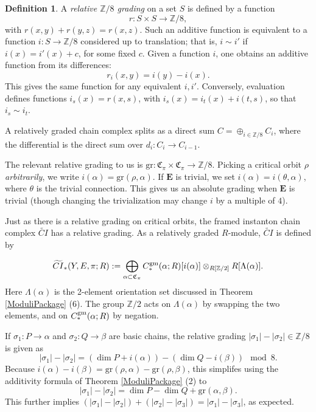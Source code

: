 \documentclass{memo-l}
\theoremstyle{definition}
\newtheorem{definition}[theorem]{Definition}
\theoremstyle{remark}
\numberwithin{section}{chapter}
\numberwithin{equation}{chapter}
\begin{document}
\begin{definition}\label{relgrading}A \emph{relative $\mathbb Z/8$ grading} on a set $S$ is defined by a function 
$$r: S \times S \to \mathbb Z/8,$$ 
with $r(x,y) + r(y,z) = r(x,z)$. Such an additive function is equivalent to a function $i: S \to \mathbb Z/8$ considered up to translation; that is, $i \sim i'$ if $i(x) = i'(x) + c$, for some fixed $c$. Given a function $i$, one obtains an additive function from its differences: $$r_i(x,y) = i(y) - i(x).$$ This gives the same function for any equivalent $i, i'$. Conversely, evaluation defines functions $i_s(x) = r(x,s)$, with $i_s(x) = i_t(x) + i(t,s)$, so that $i_s \sim i_t$. 

A relatively graded chain complex splits as a direct sum $C = \oplus_{i \in \mathbb Z/8} C_i$, where the differential is the direct sum over $d_i: C_i \to C_{i-1}$. 
\end{definition}

The relevant relative grading to us is $\text{gr}: \mathfrak C_\pi \times \mathfrak C_\pi \to \mathbb Z/8$. Picking a critical orbit $\rho$ \emph{arbitrarily}, we write $i(\alpha) = \text{gr}(\rho, \alpha)$. If $\mathbf{E}$ is trivial, we set $i(\alpha) = i(\theta, \alpha)$, where $\theta$ is the trivial connection. This gives us an absolute grading when $\mathbf{E}$ is trivial (though changing the trivialization may change $i$ by a multiple of $4$). 

Just as there is a relative grading on critical orbits, the framed instanton chain complex $\widetilde{CI}$ has a relative grading. As a relatively graded $R$-module, $\widetilde{CI}$ is defined by

$$\widetilde{CI}_*(Y,E,\pi;R) := \bigoplus_{\alpha \subset \mathfrak C_\pi} C_{*}^{\textup{gm}}(\alpha;R)[i(\alpha)] \otimes_{R[\mathbb Z/2]} R[\Lambda(\alpha)].$$ Here $\Lambda(\alpha)$ is the 2-element orientation set discussed in Theorem \ref{ModuliPackage} (6). The group $\mathbb Z/2$ acts on $\Lambda(\alpha)$ by swapping the two elements, and on $C_*^{\text{\textup{gm}}}(\alpha;R)$ by negation.

If $\sigma_1: P \to \alpha$ and $\sigma_2: Q \to \beta$ are basic chains, the relative grading $|\sigma_1| - |\sigma_2| \in \mathbb Z/8$ is given as $$|\sigma_1| - |\sigma_2| =  (\dim P + i(\alpha)) - (\dim Q - i(\beta))\mod{8}.$$ Because $i(\alpha) - i(\beta) = \text{gr}(\rho, \alpha) - \text{gr}(\rho, \beta)$, this simplifes using the additivity formula of Theorem \ref{ModuliPackage} (2) to $$|\sigma_1| - |\sigma_2| = \dim P - \dim Q + \text{gr}(\alpha, \beta).$$ This further implies $(|\sigma_1| - |\sigma_2|) + (|\sigma_2| - |\sigma_3|) = |\sigma_1| - |\sigma_3|$, as expected.
\end{document}
